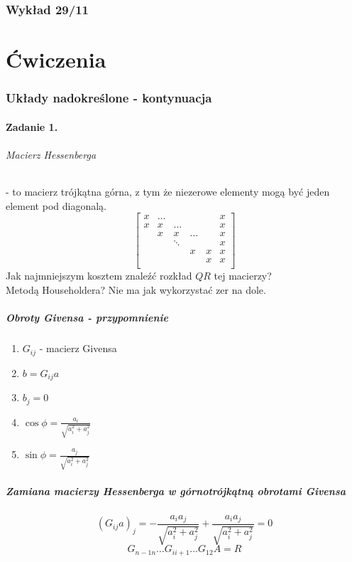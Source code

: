 \documentclass{article}
\begin{document}
\section{Wykład 29/11}

\part{Ćwiczenia}
\section{Układy nadokreślone - kontynuacja}
\subsection{Zadanie 1.}
\paragraph{Macierz Hessenberga} - to macierz trójkątna górna, z tym że niezerowe elementy mogą być jeden element pod diagonalą.
$$\begin{bmatrix}
	x&\ldots&&&&x\\
	x&x&\ldots&&&x\\
	&x&x&\ldots&&x\\
	&&\ddots&&&x\\
	&&&x&x&x\\
	&&&&x&x\\
\end{bmatrix}$$
Jak najmniejszym kosztem znaleźć rozkład $ QR $ tej macierzy?\\
Metodą Householdera? Nie ma jak wykorzystać zer na dole.
\subsubsection{Obroty Givensa - przypomnienie}
\begin{enumerate}
	\item $ G_{ij} $ - macierz Givensa
	\item $ b=G_{ij}a$
	\item $ b_j=0 $
	\item $ \cos\phi = \frac{a_i}{\sqrt{a_i^2+a_j^2}} $
	\item $ \sin\phi = \frac{a_j}{\sqrt{a_i^2+a_j^2}} $
\end{enumerate}

\subsubsection{Zamiana macierzy Hessenberga w górnotrójkątną obrotami Givensa}
$$ (G_{ij}a)_j = -\frac{a_ia_j}{\sqrt{a_i^2 + a_j^2}}+\frac{a_ia_j}{\sqrt{a_i^2 + a_j^2}}=0$$
$$G_{n-1 n}\ldots G_{i i+1}\ldots G_{12}A=R$$
\end{document}
